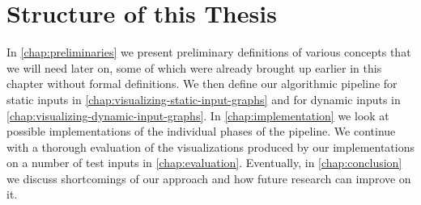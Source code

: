 \section{Structure of this Thesis}
\label{sect:structure-of-this-thesis}

In \cref{chap:preliminaries} we present preliminary definitions of various concepts that we will need later on, some of which were already brought up earlier in this chapter without formal definitions. We then define our algorithmic pipeline for static inputs in \cref{chap:visualizing-static-input-graphs} and for dynamic inputs in \cref{chap:visualizing-dynamic-input-graphs}. In \cref{chap:implementation} we look at possible implementations of the individual phases of the pipeline. We continue with a thorough evaluation of the visualizations produced by our implementations on a number of test inputs in \cref{chap:evaluation}. Eventually, in \cref{chap:conclusion} we discuss shortcomings of our approach and how future research can improve on it.
